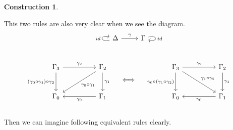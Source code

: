 \documentclass[12pt, letterpaper]{amsart}
\theoremstyle{definition}
\newtheorem{con}[thm]{Construction}
\theoremstyle{remark}
\theoremstyle{plain}
\numberwithin{equation}{section}
\begin{document}
\begin{con}
\end{con}
This two rules are also very clear when we see the diagram. 
\[
\begin{tikzcd}
{\Delta} \arrow[loop left, "id"] \arrow[r, "\gamma"] & {\Gamma} \arrow[loop right, "id"]
\end{tikzcd}
\]
\\
\[
\begin{tikzcd}[row sep = large, column sep = huge]
    {\Gamma_3} \arrow[r, "\gamma_2"]  \arrow[d, "(\gamma_0 \circ \gamma_1) \circ \gamma_2"'] & {\Gamma_2}\arrow[ld, "\gamma_0 \circ \gamma_1"] \arrow[d, "\gamma_1"] \\
    {\Gamma_0} & {\Gamma_1} \arrow[l, "\gamma_0"] 
\end{tikzcd}
\quad
\iff
\quad
\begin{tikzcd}[row sep = large, column sep = huge]
{\Gamma_3} \arrow[r, "\gamma_2"] \arrow[rd, "\gamma_1 \circ \gamma_2"] \arrow[d, "\gamma_0 \circ (\gamma_1 \circ \gamma_2)"'] & {\Gamma_2} \arrow[d, "\gamma_1"] \\
{\Gamma_0} & {\Gamma_1} \arrow[l, "\gamma_0"] 
\end{tikzcd}
\]
\\
Then we can imagine following equivalent rules clearly. 
\newpage 
\end{document}
